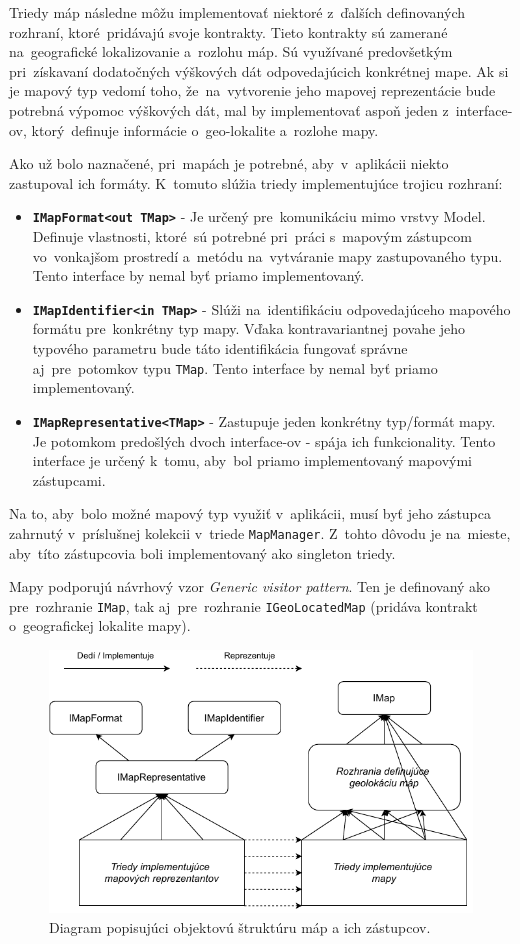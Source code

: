 Triedy máp následne môžu implementovať niektoré z~ďalších definovaných rozhraní, ktoré~pridávajú svoje kontrakty. Tieto kontrakty sú zamerané na~geografické lokalizovanie a~rozlohu máp. Sú využívané predovšetkým pri~získavaní dodatočných výškových dát odpovedajúcich konkrétnej mape. Ak si je mapový typ vedomí toho, že~na~vytvorenie jeho mapovej reprezentácie bude potrebná výpomoc výškových dát, mal by implementovať aspoň jeden z~interface-ov, ktorý~definuje informácie o~geo-lokalite a~rozlohe mapy.

Ako už bolo naznačené, pri~mapách je potrebné, aby~v~aplikácii niekto zastupoval ich formáty. K~tomuto slúžia triedy implementujúce trojicu rozhraní:
\begin{itemize}
    \item \textbf{\texttt{IMapFormat<out TMap>}} - Je určený pre~komunikáciu mimo vrstvy Model. Definuje vlastnosti, ktoré~sú potrebné pri~práci s~mapovým zástupcom vo~vonkajšom prostredí a~metódu na~vytváranie mapy zastupovaného typu. Tento interface by nemal byť priamo implementovaný.
    \item \textbf{\texttt{IMapIdentifier<in TMap>}} - Slúži na~identifikáciu odpovedajúceho mapového formátu pre~konkrétny typ mapy. Vďaka kontravariantnej povahe jeho typového parametru bude táto identifikácia fungovať správne aj~pre~potomkov typu \texttt{TMap}. Tento interface by nemal byť priamo implementovaný.
    \item \textbf{\texttt{IMapRepresentative<TMap>}} - Zastupuje jeden konkrétny typ/formát mapy. Je potomkom predošlých dvoch interface-ov - spája ich funkcionality. Tento interface je určený k~tomu, aby~bol priamo implementovaný mapovými zástupcami.   
\end{itemize}
Na to, aby~bolo možné mapový typ využiť v~aplikácii, musí byť jeho zástupca zahrnutý v~príslušnej kolekcii v~triede \texttt{MapManager}. Z~tohto dôvodu je na~mieste, aby~títo zástupcovia boli implementovaný ako singleton triedy.

Mapy podporujú návrhový vzor \textit{Generic visitor pattern}. Ten je definovaný ako pre~rozhranie \texttt{IMap}, tak aj~pre~rozhranie \texttt{IGeoLocatedMap} (pridáva kontrakt o~geografickej lokalite mapy).

\begin{figure}[h]\centering
\includegraphics[]{img/mapy_architektura}
\caption{Diagram popisujúci objektovú štruktúru máp a ich zástupcov.} 
\label{obr06:mapy_architektura}
\end{figure}

